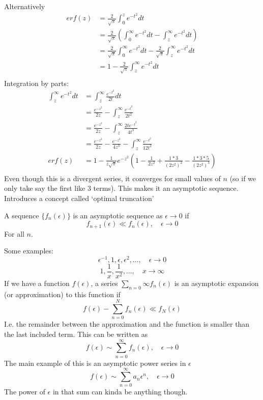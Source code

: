 \documentclass{/home/janmebows/Documents/LatexTemplates/myassignment}
\begin{document}
Alternatively
\begin{align*}
        erf(z) &= \frac{2}{\sqrt{\pi}} \int_0^z e^{-t^2}dt\\
        &= \frac{2}{\sqrt{\pi}} \left(\int_0^\infty e^{-t^2} dt - \int_z^\infty e^{-t^2} dt\right)\\
        &= \frac{2}{\sqrt{\pi}} \int_0^\infty e^{-t^2} dt - \frac{2}{\sqrt{\pi}}\int_z^\infty e^{-t^2} dt\\
        &= 1 - \frac{2}{\sqrt{\pi}}\int_z^\infty e^{-t^2} dt\\
\end{align*}
Integration by parts:
\begin{align*}
    \int_z^\infty e^{-t^2}dt &= \int_z^\infty \frac{e^{-t^2}}{2t}dt\\
    &= \frac{e^{-z^2}}{2z}- \int_z^\infty \frac{e^{-t^2}}{2t^2}\\
    &= \frac{e^{-z^2}}{2z} - \int_z^\infty \frac{2te^{-t^2}}{4t^3}\\
    &= \frac{e^{-z^2}}{2z} - \frac{e^{-z^2}}{4z^3} - \int_z^\infty \frac{e^{-t^2}}{12t^2}\\
    erf(z)&=1- \frac{1}{z\sqrt{\pi}}e^{-z^2}\left(1 - \frac{1}{2z^2} + \frac{1*3}{(2z^2)^2} - \frac{1*3*5}{(2z^2)^3} \right)\\
\end{align*}
Even though this is a divergent series, it converges for small values of $n$ (so if we only take say the first like 3 terms). This makes it an asymptotic sequence.\\
Introduces a concept called `optimal truncation'

A sequence $\{f_n(\epsilon)\}$ is an asymptotic sequence as $\epsilon\to 0$ if
\[f_{n+1}(\epsilon) \ll f_n(\epsilon), \quad \epsilon\to0\]
For all $n$.


Some examples:
\[\epsilon^{-1},1,\epsilon,\epsilon^2,\hdots, \quad \epsilon\to0\]
\[1, \frac1x,\frac1{x^2},\hdots, \quad x\to\infty\]
If we have a function $f(\epsilon)$, a series $\sum_{n=0}\infty f_n(\epsilon)$ is an asymptotic expansion (or approximation) to this function if
\[f(\epsilon) - \sum_{n=0}^N f_n(\epsilon) \ll f_N(\epsilon)\]
I.e. the remainder between the approximation and the function is smaller than the last included term. This can be written as
\[f(\epsilon) \sim \sum_{n=0}^\infty f_n(\epsilon), \quad \epsilon\to 0\]
The main example of this is an asymptotic power series in $\epsilon$
\[f(\epsilon) \sim \sum_{n=0}^\infty a_n \epsilon^n, \quad \epsilon\to 0\]
The power of $\epsilon$ in that sum can kinda be anything though.
\end{document}
